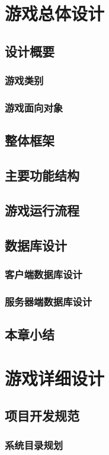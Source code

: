 \documentclass{article}
\begin{document}
\begin{CJK}{UTF8}{gbsn}
	\section{游戏总体设计}
	\subsection{设计概要}
	\subsubsection{游戏类别}
	\subsubsection{游戏面向对象}
	\subsection{整体框架}
	\subsection{主要功能结构}
	\subsection{游戏运行流程}
	\subsection{数据库设计}
	\subsubsection{客户端数据库设计}
	\subsubsection{服务器端数据库设计}
	\subsection{本章小结}

	\section{游戏详细设计}
	\subsection{项目开发规范}
	\subsubsection{系统目录规划}

\end{CJK}
\end{document}
